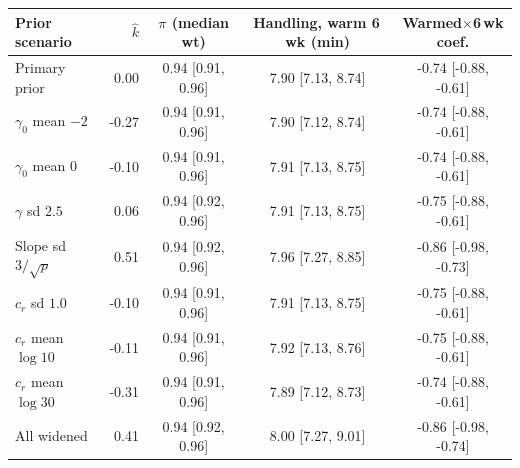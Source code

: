 \begin{tabular}{lrccc}
\toprule
Prior scenario & $\hat{k}$ & $\pi$ (median wt) & Handling, warm 6\,wk (min) & Warmed$\times$6\,wk coef. \\
\midrule
Primary prior & 0.00 & 0.94 [0.91, 0.96] & 7.90 [7.13, 8.74] & -0.74 [-0.88, -0.61] \\
$\gamma_0$ mean $-2$ & -0.27 & 0.94 [0.91, 0.96] & 7.90 [7.12, 8.74] & -0.74 [-0.88, -0.61] \\
$\gamma_0$ mean $0$ & -0.10 & 0.94 [0.91, 0.96] & 7.91 [7.13, 8.75] & -0.74 [-0.88, -0.61] \\
$\gamma$ sd $2.5$ & 0.06 & 0.94 [0.92, 0.96] & 7.91 [7.13, 8.75] & -0.75 [-0.88, -0.61] \\
Slope sd $3/\sqrt{p}$ & 0.51 & 0.94 [0.92, 0.96] & 7.96 [7.27, 8.85] & -0.86 [-0.98, -0.73] \\
$c_r$ sd $1.0$ & -0.10 & 0.94 [0.91, 0.96] & 7.91 [7.13, 8.75] & -0.75 [-0.88, -0.61] \\
$c_r$ mean $\log 10$ & -0.11 & 0.94 [0.91, 0.96] & 7.92 [7.13, 8.76] & -0.75 [-0.88, -0.61] \\
$c_r$ mean $\log 30$ & -0.31 & 0.94 [0.91, 0.96] & 7.89 [7.12, 8.73] & -0.74 [-0.88, -0.61] \\
All widened & 0.41 & 0.94 [0.92, 0.96] & 8.00 [7.27, 9.01] & -0.86 [-0.98, -0.74] \\
\bottomrule
\end{tabular}

